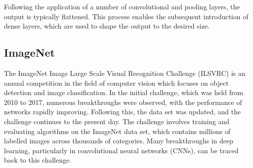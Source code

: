 \documentclass[
a4paper, 
12pt,
grayscalebody, %
abstract=on,
twoside, BCOR10mm, 12pt, DIV13,headinclude, footexclude, final, abstracton, openright
]{ibireprt}
\numberwithin{equation}{chapter}
\numberwithin{table}{chapter}
\numberwithin{figure}{chapter}
\numberwithin{algorithm}{chapter}
\numberwithin{example}{chapter}
\numberwithin{example}{chapter}
\begin{document}
Following the application of a number of convolutional and pooling layers, the output is typically flattened. This process enables the subsequent introduction of dense layers, which are used to shape the output to the desired size.





\subsection{ImageNet}
The ImageNet Image Large Scale Visual Recognition Challenge (ILSVRC) is an annual competition in the field of computer vision which focuses on object detection and image classification. In the initial challenge, which was held from 2010 to 2017, numerous breakthroughs were observed, with the performance of networks rapidly improving. Following this, the data set was updated, and the challenge continues to the present day. The challenge involves training and evaluating algorithms on the ImageNet data set, which contains millions of labelled images across thousands of categories. Many breakthroughs in deep learning, particularly in convolutional neural networks (CNNs), can be traced back to this challenge.


\end{document}
